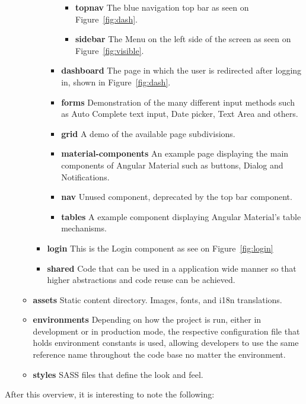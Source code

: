 \begin{itemize}
\begin{itemize}
\begin{itemize}
\begin{itemize}
        \begin{itemize}
        \item \textbf{topnav} The blue navigation top bar as seen on Figure~\ref{fig:dash}.
        \item \textbf{sidebar} The Menu on the left side of the screen as seen on Figure~\ref{fig:visible}.
        \end{itemize}
      \item \textbf{dashboard} The page in which the user is redirected after logging in, shown in Figure~\ref{fig:dash}.
      \item \textbf{forms} Demonstration of the many different input methods such as Auto Complete text input, Date picker, Text Area and others.
      \item \textbf{grid} A demo of the available page subdivisions.
      \item \textbf{material-components} An example page displaying the main components of Angular Material such as buttons, Dialog and Notifications.
      \item \textbf{nav} Unused component, deprecated by the top bar component.
      \item \textbf{tables} A example component displaying Angular Material's table mechanisms.
      \end{itemize}

    \item \textbf{login} This is the Login component as see on Figure~\ref{fig:login}
    \item \textbf{shared} Code that can be used in a application wide manner so that higher abstractions and code reuse can be achieved.
    \end{itemize}
  \item \textbf{assets} Static content directory. Images, fonts, and i18n translations.
  \item \textbf{environments} Depending on how the project is run, either in development or in production mode, the respective configuration file that holds environment constants is used, allowing developers to use the same reference name throughout the code base no matter the environment.
  \item \textbf{styles} \gls{SASS} files that define the look and feel.
  \end{itemize}
\end{itemize}

After this overview, it is interesting to note the following:

